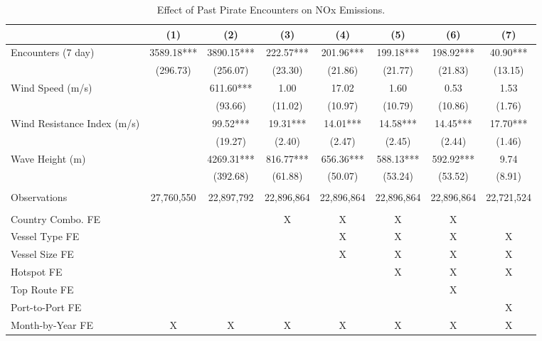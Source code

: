 \begin{table}
\centering
\caption{Effect of Past Pirate Encounters on NOx Emissions. \label{tab:spec-nox-table-rev}}
\centering
\begin{adjustbox}{width = .9\textwidth}
\begin{threeparttable}
\begin{tabular}[t]{lccccccc}
\toprule
  & (1) & (2) & (3) & (4) & (5) & (6) & (7)\\
\midrule
Encounters (7 day) & \num{3589.18}*** & \num{3890.15}*** & \num{222.57}*** & \num{201.96}*** & \num{199.18}*** & \num{198.92}*** & \num{40.90}***\\
 & (\num{296.73}) & (\num{256.07}) & (\num{23.30}) & (\num{21.86}) & (\num{21.77}) & (\num{21.83}) & (\num{13.15})\\
Wind Speed (m/s) &  & \num{611.60}*** & \num{1.00} & \num{17.02} & \num{1.60} & \num{0.53} & \num{1.53}\\
 &  & (\num{93.66}) & (\num{11.02}) & (\num{10.97}) & (\num{10.79}) & (\num{10.86}) & (\num{1.76})\\
Wind Resistance Index (m/s) &  & \num{99.52}*** & \num{19.31}*** & \num{14.01}*** & \num{14.58}*** & \num{14.45}*** & \num{17.70}***\\
 &  & (\num{19.27}) & (\num{2.40}) & (\num{2.47}) & (\num{2.45}) & (\num{2.44}) & (\num{1.46})\\
Wave Height (m) &  & \num{4269.31}*** & \num{816.77}*** & \num{656.36}*** & \num{588.13}*** & \num{592.92}*** & \num{9.74}\\
 &  & (\num{392.68}) & (\num{61.88}) & (\num{50.07}) & (\num{53.24}) & (\num{53.52}) & (\num{8.91})\\
 &  &  &  &  &  &  & \\
Observations & 27,760,550 & 22,897,792 & 22,896,864 & 22,896,864 & 22,896,864 & 22,896,864 & 22,721,524\\
 &  &  &  &  &  &  & \\
Country Combo. FE &  &  & X & X & X & X & \\
Vessel Type FE &  &  &  & X & X & X & X\\
Vessel Size FE &  &  &  & X & X & X & X\\
Hotspot FE &  &  &  &  & X & X & X\\
Top Route FE &  &  &  &  &  & X & \\
Port-to-Port FE &  &  &  &  &  &  & X\\
Month-by-Year FE & X & X & X & X & X & X & X\\
\bottomrule
\end{tabular}

\end{threeparttable}
\end{adjustbox}
\end{table}
